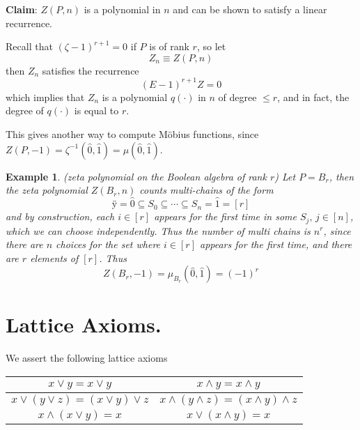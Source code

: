 \documentclass[11pt,english]{article}
\providecommand{\tabularnewline}{\\}
\newcommand{\Mob}[0]{M\"{o}bius }
\newtheorem{example}[theorem]{Example}
\begin{document}
\textbf{Claim}: $Z\left(P,n\right)$ is a polynomial in $n$ and can
be shown to satisfy a linear recurrence.

Recall that $\left(\zeta-1\right)^{r+1}=0$ if $P$ is of rank $r$,
so let\[
Z_{n}\equiv Z\left(P,n\right)\]
then $Z_{n}$ satisfies the recurrence \[
\left(E-1\right)^{r+1}Z=0\]
which implies that $Z_{n}$ is a polynomial $q\left(\cdot\right)$
in $n$ of degree $\le r$, and in fact, the degree of $q\left(\cdot\right)$
is equal to $r$.

This gives another way to compute \Mob functions, since $Z\left(P,-1\right)=\zeta^{-1}\left(\hat{0},\hat{1}\right)=\mu\left(\hat{0},\hat{1}\right)$.

\begin{example}

(zeta polynomial on the Boolean algebra of rank $r$) Let $P=B_{r}$,
then the zeta polynomial $Z\left(B_{r},n\right)$ counts multi-chains
of the form\[
\textrm{ÿ}=\hat{0}\subseteq S_{0}\subseteq\cdots\subseteq S_{n}=\hat{1}=\left[r\right]\]
and by construction, each $i\in\left[r\right]$ appears for the first
time in some $S_{j},\, j\in\left[n\right]$, which we can choose independently.
Thus the number of multi chains is $n^{r}$, since there are $n$
choices for the set where $i\in\left[r\right]$ appears for the first
time, and there are $r$ elements of $\left[r\right]$. Thus\[
Z\left(B_{r},-1\right)=\mu_{B_{r}}\left(\hat{0},\hat{1}\right)=\left(-1\right)^{r}\]


\end{example}


\section{Lattice Axioms.}

We assert the following lattice axioms

\begin{center}
\begin{tabular}{|c|c|}
\hline 
\noalign{\vskip\doublerulesep}
$x\vee y=x\vee y$ & $x\wedge y=x\wedge y$\tabularnewline[\doublerulesep]
\hline 
\noalign{\vskip\doublerulesep}
$x\vee\left(y\vee z\right)=\left(x\vee y\right)\vee z$ & $x\wedge\left(y\wedge z\right)=\left(x\wedge y\right)\wedge z$\tabularnewline[\doublerulesep]
\hline 
\noalign{\vskip\doublerulesep}
$x\wedge\left(x\vee y\right)=x$ & $x\vee\left(x\wedge y\right)=x$\tabularnewline[\doublerulesep]
\hline
\end{tabular}
\par\end{center}
\end{document}
